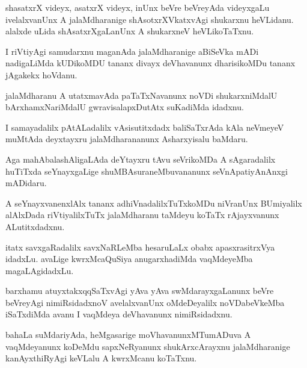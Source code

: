 \documentclass{article}
\begin{document}
\begin{mn}%
shasatxrX videyx, asatxrX videyx, inUnx beVre beVreyAda videyxgaLu ivelalxvanUnx A 
jalaMdharanige shAsotxrXVkatxvAgi shukarxnu heVLidanu. alalxde uLida shAsatxrXgaLanUnx A 
shukarxneV heVLikoTaTxnu.
\end{mn}

\begin{mn}%
I riVtiyAgi samudarxnu maganAda jalaMdharanige aBiSeVka mADi nadigaLiMda kUDikoMDU tananx 
divayx deVhavanunx dharisikoMDu tananx jAgakekx hoVdanu.
\end{mn}

\begin{mn}%
jalaMdharanu A utatxmavAda paTaTxNavanunx noVDi shukarxniMdalU bArxhamxNariMdalU 
gwravisalapxDutAtx suKadiMda idadxnu.
\end{mn}

\begin{mn}%
I samayadalilx pAtALadalilx vAsisutitxdadx baliSaTxrAda kAla neVmeyeV muMtAda deyxtayxru 
jalaMdharananunx Asharxyisalu baMdaru.
\end{mn}

\begin{mn}%
Aga mahAbalashAligaLAda deYtayxru tAvu seVrikoMDa A sAgaradalilx huTiTxda seYnayxgaLige 
shuMBAsuraneMbuvananunx seVnApatiyAnAnxgi mADidaru.
\end{mn}

\begin{mn}%
A seYnayxvanenxlAlx tananx adhiVnadalilxTuTxkoMDu niVranUnx BUmiyalilx alAlxDada 
riVtiyalilxTuTx jalaMdharanu taMdeyu koTaTx rAjayxvanunx ALutitxdadxnu.
\end{mn}

\begin{mn}%
itatx savxgaRadalilx savxNaRLeMba hesaruLaLx obabx apasxrasitrxVya idadxLu. avaLige 
kwrxMcaQuSiya anugarxhadiMda vaqMdeyeMba magaLAgidadxLu.
\end{mn}

\begin{mn}%
barxhamu atuyxtakxqqSaTxvAgi yAva yAva swMdarayxgaLanunx beVre beVreyAgi nimiRsidadxnoV 
avelalxvanUnx oMdeDeyalilx noVDabeVkeMba iSaTxdiMda avanu I vaqMdeya deVhavanunx 
nimiRsidadxnu.
\end{mn}

\begin{mn}%
bahaLa suMdariyAda, heMgasarige moVhavanunxMTumADuva A vaqMdeyanunx koDeMdu sapxNeRyanunx 
shukArxcArayxnu jalaMdharanige kanAyxthiRyAgi keVLalu A kwrxMcanu koTaTxnu.
\end{mn}
\end{document}
